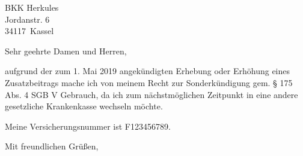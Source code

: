 \documentclass[a4paper, 12pt, KOMAold]{scrlttr2}
\newcommand{\Kundennr}{F123456789}%
\newcommand{\Empfaenger}{BKK Herkules }     %
\newcommand{\EStrasse}{Jordanstr. 6 }       %
\newcommand{\EPLZ}{34117}                   %
\newcommand{\EOrt}{Kassel}                  %
\newcommand{\DocTitle}{Kündigung der Mitgliedschaft} %
\begin{document}
    \begin{letter}{\Empfaenger \\ \EStrasse \\ \EPLZ~\EOrt}
    \date{\today}%
    \subject{\DocTitle}
    \opening{Sehr geehrte Damen und Herren,}
    aufgrund der zum 1. Mai 2019 angekündigten Erhebung oder Erhöhung eines
    Zusatzbeitrags mache ich von meinem Recht zur Sonderkündigung gem. § 175
    Abs. 4 SGB V Gebrauch, da ich zum nächstmöglichen Zeitpunkt in eine andere
    gesetzliche Krankenkasse wechseln möchte.

    Meine Versicherungsnummer ist \Kundennr{}.

    \closing{Mit freundlichen Grüßen,}
    \end{letter}
\end{document}
